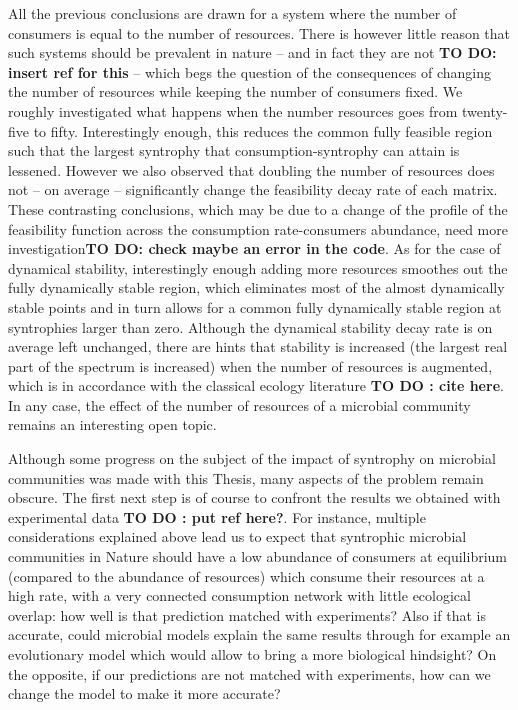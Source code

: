 \documentclass[12pt, titlepage]{report}
\begin{document}
All the previous conclusions are drawn for a system where the number of consumers is equal to the number of resources. There is however little reason that such systems should be prevalent in nature -- and in fact they are not \textbf{TO DO: insert ref for this} -- which begs the question of the consequences of changing \eg the number of resources while keeping the number of consumers fixed. We roughly investigated what happens when the number resources goes from twenty-five to fifty. Interestingly enough, this reduces the common fully feasible region such that the largest syntrophy that  consumption-syntrophy can attain is lessened. However we also observed that doubling the number of resources does not -- on average -- significantly change the feasibility decay rate of each matrix. These contrasting conclusions, which may be due to a change of the profile of the feasibility function across the consumption rate-consumers abundance, need more investigation\textbf{TO DO: check maybe an error in the code}. As for the case of dynamical stability, interestingly enough adding more resources smoothes out the fully dynamically stable region, which eliminates most of the almost dynamically stable points and in turn allows for a common fully dynamically stable region at syntrophies larger than zero. Although the dynamical stability decay rate is on average left unchanged, there are hints that stability is increased (\ie the largest real part of the spectrum is increased) when the number of resources is augmented, which is in accordance with the classical ecology literature \textbf{TO DO : cite here}. In any case, the effect of the number of resources of a microbial community remains an interesting open topic.

Although some progress on the subject of the impact of syntrophy on microbial communities was made with this Thesis, many aspects of the problem remain obscure. The first next step is of course to confront the results we obtained with experimental data \textbf{TO DO : put ref here?}.
For instance, multiple considerations explained above lead us to expect that syntrophic microbial communities in Nature should have a low abundance of consumers at equilibrium (compared to the abundance of resources) which consume their resources at a high rate, with a very connected consumption network with little ecological overlap: how well is that prediction matched with experiments? Also if that is accurate, could microbial models explain the same results through for example an evolutionary model which would allow to bring a more biological hindsight? On the opposite, if our predictions are not matched with experiments, how can we change the model to make it more accurate?
\end{document}
